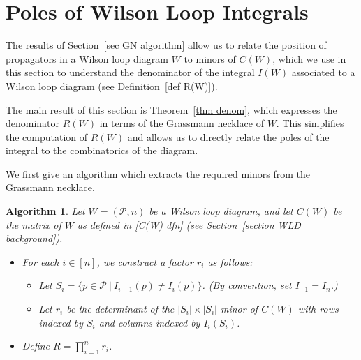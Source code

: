 \documentclass[11pt]{article}
\newcommand{\cP}{\mathcal{P}}
\newtheorem{algorithm}[thm]{Algorithm}
\theoremstyle{remark}
\theoremstyle{definition}
\begin{document}
\section{Poles of Wilson Loop Integrals}\label{sec poles}



The results of Section~\ref{sec GN algorithm} allow us to relate the position of propagators in a Wilson loop diagram $W$ to minors of $C(W)$, which we use in this section to understand the denominator of the integral $I(W)$ associated to a Wilson loop diagram (see Definition~\ref{def R(W)}). 

The main result of this section is Theorem~\ref{thm denom}, which expresses the denominator $R(W)$ in terms of the Grassmann necklace of $W$. This simplifies the computation of $R(W)$ and allows us to directly relate the poles of the integral to the combinatorics of the diagram.

We first give an algorithm which extracts the required minors from the Grassmann necklace. 


\begin{algorithm}\label{alg WLD to denom via GN}
Let $W = (\cP,n)$ be a Wilson loop diagram, and let $C(W)$ be the matrix of $W$ as defined in \eqref{C(W) dfn} (see Section~\ref{section WLD background}).
\begin{itemize}
  \item For each $i \in [n]$, we construct a factor $r_i$ as follows:
    \begin{itemize}
      \item Let $S_i = \{p \in \cP \ | \ I_{i-1}(p) \neq I_i(p)\}$. (By convention, set $I_{-1} = I_n$.)
      \item Let $r_i$ be the determinant of the $|S_i|\times |S_i|$ minor of $C(W)$ with rows indexed by $S_i$ and columns indexed by $I_i(S_i)$.  %
    \end{itemize}
  \item Define $R = \prod_{i=1}^n r_i$.
\end{itemize}
\end{algorithm}
\end{document}
